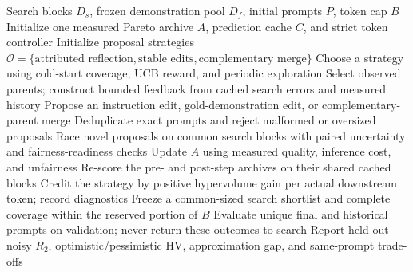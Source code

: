 \begin{algorithm}[t]
\caption{Tri-Fair: shared-budget adaptive prompt optimization (v8.6)}
\label{alg:trifair}
\begin{algorithmic}[1]
\Require Search blocks $D_s$, frozen demonstration pool $D_f$, initial prompts $P$, token cap $B$
\State Initialize one measured Pareto archive $A$, prediction cache $C$, and strict token controller
\State Initialize proposal strategies $\mathcal O=\{\text{attributed reflection},\text{stable edits},\text{complementary merge}\}$
  \State Choose a strategy using cold-start coverage, UCB reward, and periodic exploration
  \State Select observed parents; construct bounded feedback from cached search errors and measured history
  \State Propose an instruction edit, gold-demonstration edit, or complementary-parent merge
  \State Deduplicate exact prompts and reject malformed or oversized proposals
  \State Race novel proposals on common search blocks with paired uncertainty and fairness-readiness checks
  \State Update $A$ using measured quality, inference cost, and unfairness
  \State Re-score the pre- and post-step archives on their shared cached blocks
  \State Credit the strategy by positive hypervolume gain per actual downstream token; record diagnostics
\EndWhile
\State Freeze a common-sized search shortlist and complete coverage within the reserved portion of $B$
\State Evaluate unique final and historical prompts on validation; never return these outcomes to search
\State Report held-out noisy $R_2$, optimistic/pessimistic HV, approximation gap, and same-prompt trade-offs
\end{algorithmic}
\end{algorithm}
